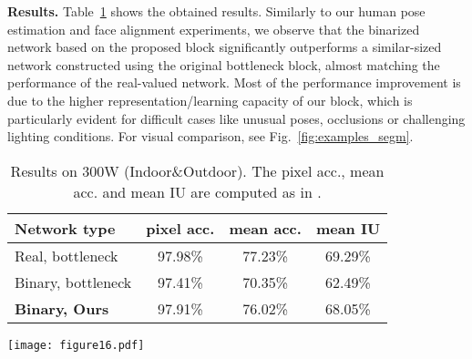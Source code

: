 \documentclass[10pt,journal,compsoc]{IEEEtran}
\begin{document}
\textbf{Results.}  Table{~\ref{tab:segm_results}} shows the obtained results. Similarly to our human pose estimation and face alignment experiments, we observe that the binarized network based on the proposed block significantly outperforms a similar-sized network constructed using the original bottleneck block, almost matching the performance of the real-valued network. Most of the performance improvement is due to the higher representation/learning capacity of our block, which is particularly evident for difficult cases like unusual poses, occlusions or challenging lighting conditions. For visual comparison, see  Fig.{~\ref{fig:examples_segm}}.
\begin{table}[!htbp]
    \renewcommand{\arraystretch}{1.3}
    \caption{Results on 300W (Indoor\&Outdoor). The pixel acc., mean acc. and mean IU are computed as in {\cite{long2015fully}}.}
    \label{tab:segm_results}
    \centering
    \begin{tabular}{|l|c|c|c|}
        \hline
        Network type          & pixel acc. & mean acc. & mean IU \\
        \hline\hline
        Real, bottleneck      & 97.98\%    & 77.23\%   & 69.29\% \\
        Binary, bottleneck    & 97.41\%    & 70.35\%   & 62.49\% \\
        \textbf{Binary, Ours} & 97.91\%    & 76.02\%   & 68.05\% \\
        \hline
    \end{tabular}
\end{table}

\begin{figure*}[!t]
    \centering

		
    \caption{Qualitative results produced by our method on (a) AFLW2000-3D and (b) MPII datasets.}
    \label{fig:examples}
\end{figure*}

\begin{figure*}[!t]
    \centering
    \texttt{[image: figure16.pdf]}
    \caption{Qualitative results on 300W (Indoor\&Outdoor). Observe that the proposed binarized network significantly outperforms the original binary one, almost matching the performance of the real-valued network.}
    \label{fig:examples_segm}
\end{figure*}
\end{document}

